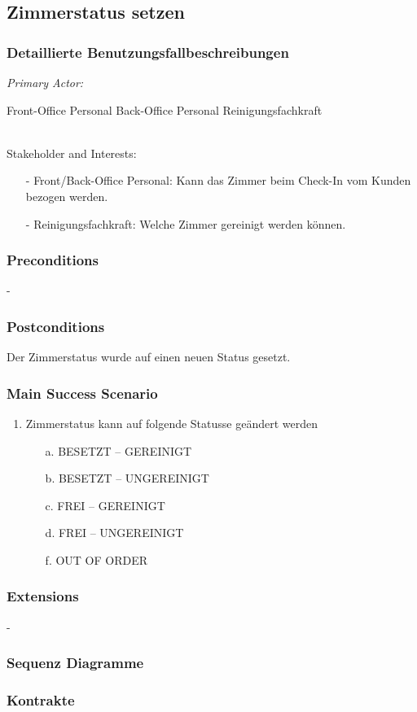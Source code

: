 \documentclass[./detailed_overview_usecases.tex]{subfiles}
\begin{document}
    \subsection{Zimmerstatus setzen}
    \subsubsection{Detaillierte Benutzungsfallbeschreibungen}
    \textit{Primary Actor:}
    \begin{enumerate}
        Front-Office Personal
        Back-Office Personal
        Reinigungsfachkraft
    \end{enumerate}
    \\
    Stakeholder and Interests:
    \begin{itemize}
        \item[-] Front/Back-Office Personal: Kann das Zimmer beim Check-In vom Kunden bezogen werden.
        \item[-] Reinigungsfachkraft: Welche Zimmer gereinigt werden können.
    \end{itemize}

    \subsubsection*{Preconditions}
    -
    \subsubsection*{Postconditions}
    Der Zimmerstatus wurde auf einen neuen Status gesetzt.

    \subsubsection*{Main Success Scenario}
    \begin{enumerate}
        \item Zimmerstatus kann auf folgende Statusse geändert werden
        \begin{itemize}
            \item[a.] BESETZT – GEREINIGT
            \item[b.] BESETZT – UNGEREINIGT
            \item[c.] FREI – GEREINIGT
            \item[d.] FREI – UNGEREINIGT
            \item[f.] OUT OF ORDER
        \end{itemize}
    \end{enumerate}

    \subsubsection*{Extensions}
    -

    \subsubsection{Sequenz Diagramme}
    \subsubsection{Kontrakte}
\end{document}
